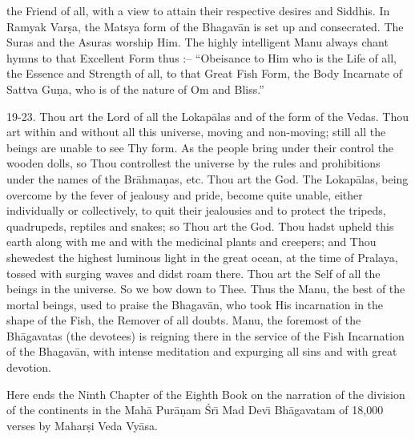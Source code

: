 the Friend of all, with a view to attain their respective desires and Siddhis. In Ramyak Var\d{s}a, the Matsya form of the Bhagav\=an is set up and consecrated. The Suras and the Asuras worship Him. The highly intelligent Manu always chant hymns to that Excellent Form thus :-- ``Obeisance to Him who is the Life of all, the Essence and Strength of all, to that Great Fish Form, the Body Incarnate of Sattva Gu\d{n}a, who is of the nature of Om and Bliss.''

19-23. Thou art the Lord of all the Lokap\=alas and of the form of the Vedas. Thou art within and without all this universe, moving and non-moving; still all the beings are unable to see Thy form. As the people bring under their control the wooden dolls, so Thou controllest the universe by the rules and prohibitions under the names of the Br\=ahma\d{n}as, etc. Thou art the God. The Lokap\=alas, being overcome by the fever of jealousy and pride, become quite unable, either individually or collectively, to quit their jealousies and to protect the tripeds, quadrupeds, reptiles and snakes; so Thou art the God. Thou hadst upheld this earth along with me and with the medicinal plants and creepers; and Thou shewedest the highest luminous light in the great ocean, at the time of Pralaya, tossed with surging waves and didst roam there. Thou art the Self of all the beings in the universe. So we bow down to Thee. Thus the Manu, the best of the mortal beings, used to praise the Bhagav\=an, who took His incarnation in the shape of the Fish, the Remover of all doubts. Manu, the foremost of the Bh\=agavatas (the devotees) is reigning there in the service of the Fish Incarnation of the Bhagav\=an, with intense meditation and expurging all sins and with great devotion.

Here ends the Ninth Chapter of the Eighth Book on the narration of the division of the continents in the Mah\=a Pur\=a\d{n}am \'Sr\={\i} Mad Dev\={\i} Bh\=agavatam of 18,000 verses by Mahar\d{s}i Veda Vy\=asa.



